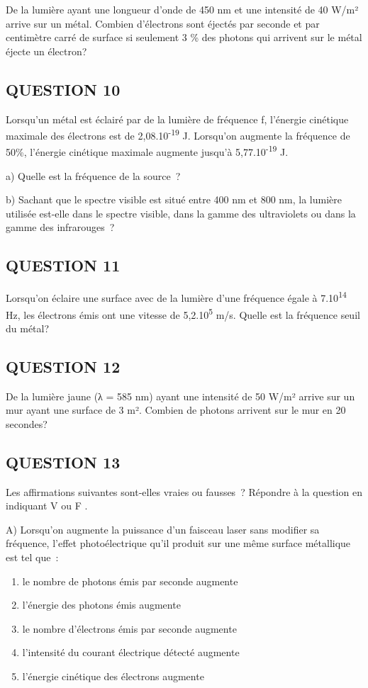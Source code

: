 {{{De la lumière ayant une longueur d'onde de 450 nm et une intensité de 40
W/m² arrive sur un métal. Combien d'électrons sont éjectés par seconde
et par centimètre carré de surface si seulement 3 \% des photons qui
arrivent sur le métal éjecte un électron?

\subsection{QUESTION 10}

Lorsqu'un métal est éclairé par de la lumière de fréquence f, l'énergie
cinétique maximale des électrons est de 2,08.10\textsuperscript{-19} J.
Lorsqu'on augmente la fréquence de 50\%, l'énergie cinétique maximale
augmente jusqu'à 5,77.10\textsuperscript{-19} J.

a) Quelle est la fréquence de la source~?

b) Sachant que le spectre visible est situé entre 400 nm et 800 nm, la
lumière utilisée est-elle dans le spectre visible, dans la gamme des
ultraviolets ou dans la gamme des infrarouges~?

\subsection{QUESTION 11}

Lorsqu'on éclaire une surface avec de la lumière d'une fréquence égale à
7.10\textsuperscript{14 }Hz, les électrons émis ont une vitesse de
5,2.10\textsuperscript{5} m/s. Quelle est la fréquence seuil du métal?

\subsection{QUESTION 12}

De la lumière jaune (λ = 585 nm) ayant une intensité de 50 W/m² arrive
sur un mur ayant une surface de 3 m². Combien de photons arrivent sur le
mur en 20 secondes?

\subsection{QUESTION 13}

Les affirmations suivantes sont-elles vraies ou fausses~? Répondre à la
question en indiquant V ou F .

A) Lorsqu'on augmente la puissance d'un faisceau laser sans modifier sa
fréquence, l'effet photoélectrique qu'il produit sur une même surface
métallique est tel que~:
\begin{enumerate}
\item  le nombre de photons émis par seconde augmente
\item  l'énergie des photons émis augmente
\item  le nombre d'électrons émis par seconde augmente
\item  l'intensité du courant électrique détecté augmente
\item  l'énergie cinétique des électrons augmente
\end{enumerate}

}}}
